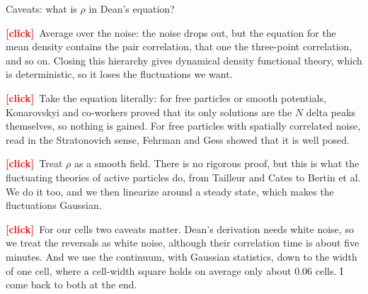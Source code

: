 \documentclass[12pt,aspectratio=169]{beamer}
\newcommand{\clk}{\textbf{\textcolor{red}{[click]}}\ }
\begin{document}
\begin{frame}[t,label=m-caveats]{Caveats: what is $\rho$ in Dean's equation?}
{\clk Average over the noise: the noise drops out, but the equation for the mean density contains the pair correlation, that one the three-point correlation, and so on. Closing this hierarchy gives dynamical density functional theory, which is deterministic, so it loses the fluctuations we want.

\clk Take the equation literally: for free particles or smooth potentials, Konarovskyi and co-workers proved that its only solutions are the $N$ delta peaks themselves, so nothing is gained. For free particles with spatially correlated noise, read in the Stratonovich sense, Fehrman and Gess showed that it is well posed.

\clk Treat $\rho$ as a smooth field. There is no rigorous proof, but this is what the fluctuating theories of active particles do, from Tailleur and Cates to Bertin et al. We do it too, and we then linearize around a steady state, which makes the fluctuations Gaussian.

\clk For our cells two caveats matter. Dean's derivation needs white noise, so we treat the reversals as white noise, although their correlation time is about five minutes. And we use the continuum, with Gaussian statistics, down to the width of one cell, where a cell-width square holds on average only about 0.06 cells. I come back to both at the end.}
\end{frame}
\end{document}
